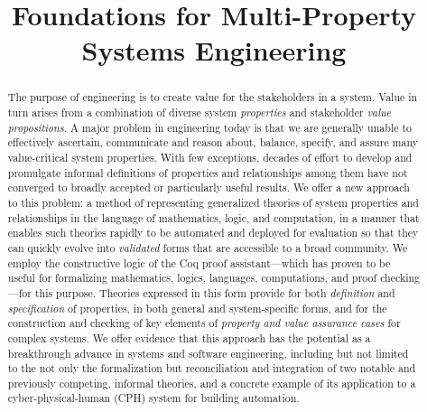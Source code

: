 \documentclass[conference]{IEEEtran}
\begin{document}
%
\title{Foundations for Multi-Property Systems Engineering}

\author{
}


\maketitle
\begin{abstract}
The purpose of engineering is to create value for the stakeholders in a system. Value in turn arises from a combination of diverse system {\em properties} and stakeholder {\em value propositions}. A major problem in engineering today is that we are generally unable to effectively ascertain, communicate and reason about, balance, specify, and assure many value-critical system properties. With few exceptions, decades of effort to develop and promulgate informal definitions of properties and relationships among them have not converged to broadly accepted or particularly useful results. We offer a new approach to this problem: a method of representing generalized theories of system properties and relationships in the language of mathematics, logic, and computation, in a manner that enables such theories rapidly to be automated and deployed for evaluation so that they can quickly evolve into {\em validated} forms that are accessible to a broad community. We employ the constructive logic of the Coq proof assistant---which has proven to be useful for formalizing mathematics, logics, languages, computations, and proof checking---for this purpose. Theories expressed in this form provide for both {\em definition} and {\em specification} of properties, in both general and system-specific forms, and for the construction and checking of key elements of {\em property and value assurance cases} for complex systems. We offer evidence that this approach has the potential as a breakthrough advance in systems and software engineering, including but not limited to the not only the formalization but reconciliation and integration of two notable and previously competing, informal theories, and a concrete example of its application to a cyber-physical-human (CPH) system for building automation.
\end{abstract}
\end{document}
